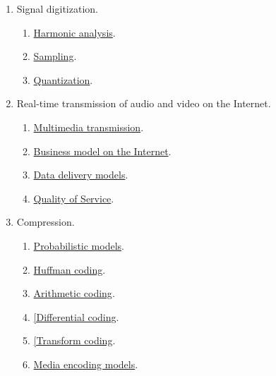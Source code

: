 \begin{enumerate}
\item Signal digitization.
  \begin{enumerate}               
  \item \href{https://cdn.rawgit.com/vicente-gonzalez-ruiz/harmonic_analysis/master/index.html}{Harmonic analysis}.
  \item \href{https://cdn.rawgit.com/vicente-gonzalez-ruiz/sampling/master/index.html}{Sampling}.
  \item \href{https://cdn.rawgit.com/vicente-gonzalez-ruiz/quantization/master/index.html}{Quantization}.
  \end{enumerate}
  
\item Real-time transmission of audio and video on the Internet.
  \begin{enumerate}
  \item \href{(https://cdn.rawgit.com/vicente-gonzalez-ruiz/multimedia_transmission/master/index.html}{Multimedia transmission}.
  \item \href{https://cdn.rawgit.com/vicente-gonzalez-ruiz/Intenet_business_model/master/index.html}{Business model on the Internet}.
  \item \href{https://cdn.rawgit.com/vicente-gonzalez-ruiz/data_delivery_models/master/index.html}{Data delivery models}.
  \item \href{https://cdn.rawgit.com/vicente-gonzalez-ruiz/quality_of_service/master/index.html}{Quality of Service}.
  \end{enumerate}
  
\item Compression.
  \begin{enumerate}
  \item \href{https://cdn.rawgit.com/vicente-gonzalez-ruiz/Probabilistic_Models/master/index.html}{Probabilistic models}.
  \item \href{https://rawgit.com/vicente-gonzalez-ruiz/Huffman_Coding/master/index.html}{Huffman coding}.
  \item \href{https://cdn.rawgit.com/vicente-gonzalez-ruiz/Arithmetic_Coding/master/index.html}{Arithmetic coding}.
  \item \href{https://cdn.rawgit.com/vicente-gonzalez-ruiz/differential_coding/master/index.html}{[Differential coding}.
  \item \href{https://cdn.rawgit.com/vicente-gonzalez-ruiz/transform_coding/master/index.html}{[Transform coding}.
  \item \href{https://cdn.rawgit.com/vicente-gonzalez-ruiz/media_encoding_models/master/index.html}{Media encoding models}.
  \end{enumerate}

\end{enumerate}

%

